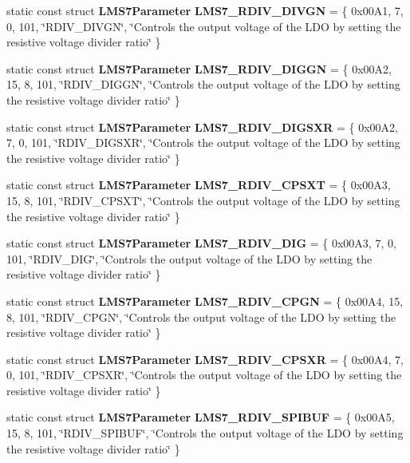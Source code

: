\begin{DoxyCompactItemize}
\item 
static const struct {\bf L\+M\+S7\+Parameter} {\bf L\+M\+S7\+\_\+\+R\+D\+I\+V\+\_\+\+D\+I\+V\+GN} = \{ 0x00\+A1, 7, 0, 101, \char`\"{}\+R\+D\+I\+V\+\_\+\+D\+I\+V\+G\+N\char`\"{}, \char`\"{}\+Controls the output voltage of the L\+D\+O by setting the resistive voltage divider ratio\char`\"{} \}
\item 
static const struct {\bf L\+M\+S7\+Parameter} {\bf L\+M\+S7\+\_\+\+R\+D\+I\+V\+\_\+\+D\+I\+G\+GN} = \{ 0x00\+A2, 15, 8, 101, \char`\"{}\+R\+D\+I\+V\+\_\+\+D\+I\+G\+G\+N\char`\"{}, \char`\"{}\+Controls the output voltage of the L\+D\+O by setting the resistive voltage divider ratio\char`\"{} \}
\item 
static const struct {\bf L\+M\+S7\+Parameter} {\bf L\+M\+S7\+\_\+\+R\+D\+I\+V\+\_\+\+D\+I\+G\+S\+XR} = \{ 0x00\+A2, 7, 0, 101, \char`\"{}\+R\+D\+I\+V\+\_\+\+D\+I\+G\+S\+X\+R\char`\"{}, \char`\"{}\+Controls the output voltage of the L\+D\+O by setting the resistive voltage divider ratio\char`\"{} \}
\item 
static const struct {\bf L\+M\+S7\+Parameter} {\bf L\+M\+S7\+\_\+\+R\+D\+I\+V\+\_\+\+C\+P\+S\+XT} = \{ 0x00\+A3, 15, 8, 101, \char`\"{}\+R\+D\+I\+V\+\_\+\+C\+P\+S\+X\+T\char`\"{}, \char`\"{}\+Controls the output voltage of the L\+D\+O by setting the resistive voltage divider ratio\char`\"{} \}
\item 
static const struct {\bf L\+M\+S7\+Parameter} {\bf L\+M\+S7\+\_\+\+R\+D\+I\+V\+\_\+\+D\+IG} = \{ 0x00\+A3, 7, 0, 101, \char`\"{}\+R\+D\+I\+V\+\_\+\+D\+I\+G\char`\"{}, \char`\"{}\+Controls the output voltage of the L\+D\+O by setting the resistive voltage divider ratio\char`\"{} \}
\item 
static const struct {\bf L\+M\+S7\+Parameter} {\bf L\+M\+S7\+\_\+\+R\+D\+I\+V\+\_\+\+C\+P\+GN} = \{ 0x00\+A4, 15, 8, 101, \char`\"{}\+R\+D\+I\+V\+\_\+\+C\+P\+G\+N\char`\"{}, \char`\"{}\+Controls the output voltage of the L\+D\+O by setting the resistive voltage divider ratio\char`\"{} \}
\item 
static const struct {\bf L\+M\+S7\+Parameter} {\bf L\+M\+S7\+\_\+\+R\+D\+I\+V\+\_\+\+C\+P\+S\+XR} = \{ 0x00\+A4, 7, 0, 101, \char`\"{}\+R\+D\+I\+V\+\_\+\+C\+P\+S\+X\+R\char`\"{}, \char`\"{}\+Controls the output voltage of the L\+D\+O by setting the resistive voltage divider ratio\char`\"{} \}
\item 
static const struct {\bf L\+M\+S7\+Parameter} {\bf L\+M\+S7\+\_\+\+R\+D\+I\+V\+\_\+\+S\+P\+I\+B\+UF} = \{ 0x00\+A5, 15, 8, 101, \char`\"{}\+R\+D\+I\+V\+\_\+\+S\+P\+I\+B\+U\+F\char`\"{}, \char`\"{}\+Controls the output voltage of the L\+D\+O by setting the resistive voltage divider ratio\char`\"{} \}

\end{DoxyCompactItemize}
